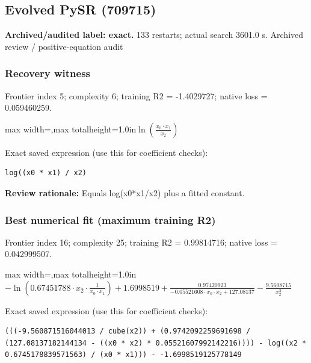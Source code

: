 \documentclass[10pt,letterpaper,landscape]{article}
\begin{document}
\begin{minipage}[t]{0.485\textwidth}
\subsection*{Evolved PySR (709715)}
\textbf{Archived/audited label: exact.} 133 restarts; actual search 3601.0 s.
{\small Archived review / positive-equation audit}
\subsubsection*{Recovery witness}
Frontier index 5; complexity 6; training R2 = -1.4029727; native loss = 0.059460259.
\begin{center}\begin{adjustbox}{max width=\linewidth,max totalheight=1.0in}$\displaystyle \ln{\left(\frac{x_{0} \cdot x_{1}}{x_{2}} \right)}$\end{adjustbox}\end{center}
{\scriptsize Exact saved expression (use this for coefficient checks):}
\begin{lstlisting}
log((x0 * x1) / x2)
\end{lstlisting}
{\small\textbf{Review rationale:} Equals log(x0*x1/x2) plus a fitted constant.}
\subsubsection*{Best numerical fit (maximum training R2)}
Frontier index 16; complexity 25; training R2 = 0.99814716; native loss = 0.042999507.
\begin{center}\begin{adjustbox}{max width=\linewidth,max totalheight=1.0in}$\displaystyle - \ln{\left(0.67451788 \cdot x_{2} \cdot \frac{1}{x_{0} \cdot x_{1}} \right)} + 1.6998519 + \frac{0.97420923}{- 0.05521608 \cdot x_{0} \cdot x_{2} + 127.08137} - \frac{9.5608715}{x_{2}^{3}}$\end{adjustbox}\end{center}
{\scriptsize Exact saved expression (use this for coefficient checks):}
\begin{lstlisting}
(((-9.560871516044013 / cube(x2)) + (0.9742092259691698 / (127.08137182144134 - ((x0 * x2) * 0.05521607992142216)))) - log((x2 * 0.6745178839571563) / (x0 * x1))) - -1.6998519125778149
\end{lstlisting}
\end{minipage}
\clearpage{}\label{ideal_gas-10007}
\end{document}
